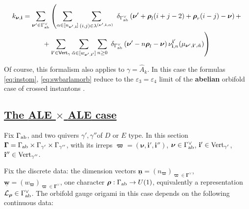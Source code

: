\documentclass[12pt]{amsart}
\newcommand {\3}{\underline{\bf 3}}
\newcommand {\4}{\underline{\bf 4}}
\newcommand {\6}{\underline{\bf 6}}
\newcommand {\ib} {\mathbf{i}}
\newcommand {\bn}{\underline{\mathbf{n}}}
\newcommand {\bw} {\underline{\mathbf{w}}}
\newcommand {\bnu} {{\boldsymbol{\nu}}}
\newcommand {\bro} {{\boldsymbol{\rho}}}
\newcommand {\bom} {{\boldsymbol{\varpi}}}
\newcommand {\CalL} {\mathcal L}
\newcommand{\ve}{\varepsilon}
\renewcommand{\hat}{\widehat}
\newcommand{\Gammadi}{\boldsymbol{\Gamma}}
\newcommand{\Gamab}{{\Gamma}_{\rm ab}}
\newcommand{\Gamav}{{\Gamma}^{\vee}_{\rm ab}}
\newcommand{\Vg}{\mathsf{Vert}_{\gamma}}
\newcommand{\subsec}[1]{\subsection{\underline{\bf #1}}}
\begin{document}
\begin{multline}
k_{\bnu, {\ib}} =  \sum_{{\bnu}'\in {\Gamav}} \left( 
\sum_{{\alpha} \in [n_{\bnu', \ib}]} \sum_{(i,j) \in {\lambda}^{({\bnu}', {\ib}, {\alpha})}}\
{\delta}_{{\Gamav}} \left( {\bnu}' + {\bro}_{l}(i+j-2) + {\bro}_{r}(i-j) - {\bnu} \right)  + \right. \\
+ \left. 
\sum_{{\ib}' \in {\Vg}} \sum_{{\tilde\alpha} \in [w_{\bnu', \ib'}]} \sum_{n\geq 0} \
{\delta}_{{\Gamav}} \left( {\bnu}' - n {\bro}_{l} - {\bnu} \right) {\nu}^{{\ib}'}_{{\ib}, n} ( {\mu}_{{\bnu}', {\ib}', {\tilde\alpha}}) \right)
\label{eq:instom}
\end{multline}

Of course, this formalism also applies to $\gamma = {\hat A}_{k}$. In this case the formulas \eqref{eq:instom}, \eqref{eq:swbarlamorb} reduce to the ${\ve}_{3} = {\ve}_{4}$ limit
of the {\bf abelian} orbifold case of crossed instantons \cite{Nekrasov:2016qym}. 
 
\subsec{The {\bf ALE} $\times$ {\bf ALE} case}

Fix $\Gamab$, and two quivers $\gamma' , \gamma''$of $D$ or $E$ type. 
In this section $\Gammadi = \Gamab \times {\Gamma}_{\gamma'} \times {\Gamma}_{\gamma''}$, with its irreps $\bom = ( {\bnu}, {\ib}', {\ib}'' )$, ${\bnu} \in \Gamav$, ${\ib}' \in {\rm Vert}_{\gamma'}$, ${\ib}''  \in {\rm Vert}_{\gamma''}$. 

Fix the discrete data: the dimension vectors ${\bn} = (n_{\bom})_{{\bom} \in {\Gammadi}^{\vee}}$,   ${\bw} = ( w_{\bom})_{{\bom} \in {\Gammadi}^{\vee}}$, one character ${\bro}: {\Gamab} \to U(1)$, equivalently a representation ${\CalL}_{\bro} \in {\Gamav}$. 
The orbifold gauge origami in this case depends on the following continuous data:
\end{document}
